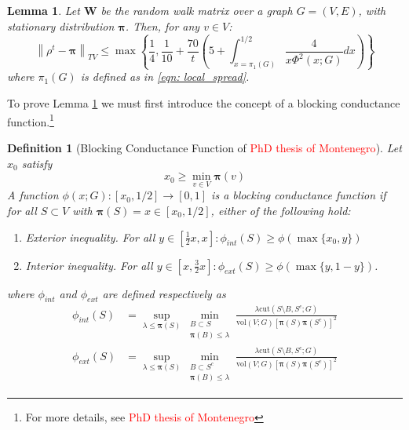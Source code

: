 \documentclass{article}
\newcommand{\vol}{\mathrm{vol}}
\newcommand{\norm}[1]{\left\lVert#1\right\rVert}
\newcommand{\1}{\mathbf{1}}
\newcommand{\cut}{\mathrm{cut}}
\newcommand{\pibf}{\bm{\pi}}
\newcommand{\Wbf}{\mathbf{W}}
\theoremstyle{aldenthm}
\newtheorem{lemma}{Lemma}
\newtheorem{definition}{Definition}
\begin{document}
\begin{lemma}
	\label{lem: montenegro}
	Let $\Wbf$ be the random walk matrix over a graph $G = (V,E)$, with stationary distribution $\pibf$. Then, for any $v \in V$:
	\begin{equation*}
	\norm{\rho^t - \pibf}_{TV} \leq \max\left\{ \frac{1}{4}, \frac{1}{10} +  \frac{70}{t}\left(5 + \int_{x = \pi_1(G)}^{1/2} \frac{4}{x \Phi^2(x; G)} dx\right) \right\}
	\end{equation*}
	where $\pi_1(G)$ is defined as in \eqref{eqn: local_spread}.
\end{lemma}

To prove Lemma \ref{lem: montenegro} we must first introduce the concept of a blocking conductance function.\footnote{For more details, see \textcolor{red}{PhD thesis of Montenegro}}

\begin{definition}[Blocking Conductance Function of \textcolor{red}{PhD thesis of Montenegro}]
	\label{def: bcf}
	Let $x_0$ satisfy
	\begin{equation*}
	x_0 \geq \min_{v \in V} \pibf(v)
	\end{equation*}
	A function $\phi(x; G): [x_0, 1/2] \to [0,1]$ is a \emph{blocking conductance function} if for all $S \subset V$ with $\pibf(S) = x \in [x_0, 1/2]$, either of the following hold: 
	\begin{enumerate}
		\item \emph{Exterior inequality.} For all $y \in \left[\frac{1}{2}x, x\right]: \phi_{int}(S) \geq \phi(\max\{x_0,y\})$
		\item \emph{Interior inequality.} For all $y  \in \left[x, \frac{3}{2}x\right]: \phi_{ext}(S) \geq \phi(\max\{y,1 -y\})$.
	\end{enumerate}
	where $\phi_{int}$ and $\phi_{ext}$ are defined respectively as
	\begin{align*}
	\phi_{int}(S) & = \sup_{\lambda \leq \pibf(S)} \min_{\substack{B \subset S \\ \pibf(B) \leq \lambda} } \frac{\lambda \cut(S \setminus B, S^c; G)}{\vol(V; G) \left[\pibf(S) \pibf(S^c)\right]^2} \\
	\phi_{ext}(S) & = \sup_{\lambda \leq \pibf(S)} \min_{\substack{B \subset S^c \\ \pibf(B) \leq \lambda} } \frac{\lambda \cut(S \setminus B, S^c; G)}{\vol(V; G) \left[\pibf(S) \pibf(S^c)\right]^2}
	\end{align*}
\end{definition}
\end{document}
